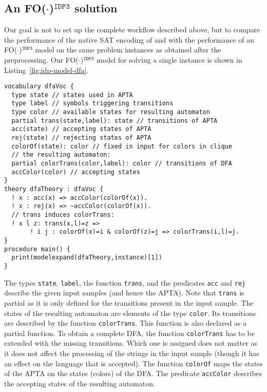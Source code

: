 \documentclass{tlp}
\newcommand{\fodotidp}{{\sc FO($\cdot$)$^{\mathtt{IDP3}}$}\xspace}
\renewcommand{\|}{\ensuremath{\,|\,}}
\renewcommand{\|}{\,|\,}
\begin{document}
\subsection{An \fodotidp solution}


Our goal is not to set up the complete workflow described above, but
to compare the performance of the native SAT encoding of
 and  with the performance of an
\fodotidp model on the same problem instances as obtained after the
preprocessing. Our \fodotidp model for solving a single instance is
shown in Listing~\ref{fig:idp-model-dfa}.

\begin{lstlisting}[caption={Modeling DFA in \fodotidp.},label={fig:idp-model-dfa}]
vocabulary dfaVoc {
  type state // states used in APTA
  type label // symbols triggering transitions
  type color // available states for resulting automaton
  partial trans(state,label): state // transitions of APTA
  acc(state) // accepting states of APTA
  rej(state) // rejecting states of APTA
  colorOf(state): color // fixed in input for colors in clique
  // the resulting automaton:
  partial colorTrans(color,label): color // transitions of DFA
  accColor(color) // accepting states
}
theory dfaTheory : dfaVoc {
  ! x : acc(x) => accColor(colorOf(x)).
  ! x : rej(x) => ~accColor(colorOf(x)).
  // trans induces colorTrans:
  ! x l z: trans(x,l)=z => 
       ! i j : colorOf(x)=i & colorOf(z)=j => colorTrans(i,l)=j.
}
procedure main() {
  print(modelexpand(dfaTheory,instance)[1])
}
\end{lstlisting}



The types \texttt{state}, \texttt{label}, the function \texttt{trans},
and the predicates \texttt{acc} and \texttt{rej} describe the given
input samples (and hence the APTA). Note that \texttt{trans} is
partial as it is only defined for the transitions present in the input
sample.  The states of the resulting automaton are elements of the
type \texttt{color}.  Its transitions are described by the function
\texttt{colorTrans}. This function is also declared as a partial
function. To obtain a complete DFA, the function \texttt{colorTrans}
has to be extended with the missing transitions. Which one is assigned
does not matter as it does not affect the processing of the strings in
the input sample (though it has an effect on the language that is
accepted).  The function \texttt{colorOf} maps the states of the APTA
on the states (colors) of the DFA. The predicate \texttt{accColor}
describes the accepting states of the resulting automaton.
\end{document}
